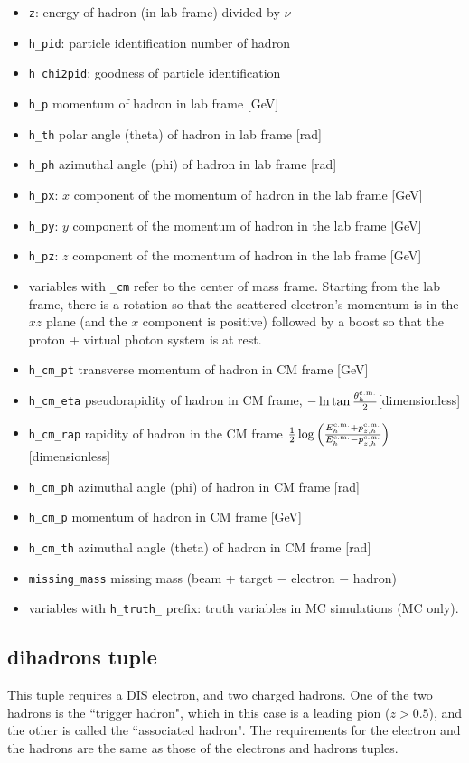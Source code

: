 \documentclass[english]{article}
\newcommand{\code}[1]{\texttt{#1}}
\begin{document}
\begin{itemize}
\item \code{z}:  energy of hadron (in lab frame) divided by $\nu$
\item \code{h\_pid}:  particle identification number of hadron \cite{pdgcodes}
\item \code{h\_chi2pid}:  goodness of particle identification
\item \code{h\_p} momentum of hadron in lab frame [GeV]
\item \code{h\_th} polar angle (theta) of hadron in lab frame [rad]
\item \code{h\_ph} azimuthal angle (phi) of hadron in lab frame [rad]
\item \code{h\_px}: $x$ component of the momentum of hadron in the lab frame [GeV]
\item \code{h\_py}: $y$ component of the momentum of hadron in the lab frame [GeV]
\item \code{h\_pz}: $z$ component of the momentum of hadron in the lab frame [GeV]
\item variables with \code{\_cm} refer to the center of mass frame.  Starting from the lab frame, there is a rotation so that the scattered electron's momentum is in the $xz$ plane (and the $x$ component is positive) followed by a boost so that the proton + virtual photon system is at rest.  
\item \code{h\_cm\_pt} transverse momentum of hadron in CM frame [GeV]
\item \code{h\_cm\_eta} pseudorapidity of hadron in CM frame, $-\ln\tan\frac{\theta^{\rm c.m.}_h}{2}$[dimensionless]
\item \code{h\_cm\_rap} rapidity of hadron in the CM frame $\frac {1}{2} \log\left(\frac{E^{\rm c.m.}_h+p^{\rm c.m.}_{z,h}}{E^{\rm c.m.}_h-p^{\rm c.m.}_{z,h}}\right)$ [dimensionless]
\item \code{h\_cm\_ph} azimuthal angle (phi) of hadron in CM frame [rad]
\item \code{h\_cm\_p}  momentum of hadron in CM frame [GeV]
\item \code{h\_cm\_th} azimuthal angle (theta) of hadron in CM frame [rad]
\item \code{missing\_mass} missing mass (beam + target $-$ electron $-$ hadron)
\item variables with \code{h\_truth\_} prefix: truth variables in MC simulations (MC only).  
\end{itemize}


\subsection{dihadrons tuple} 
This tuple requires a DIS electron, and two charged hadrons.  One of the two hadrons is the ``trigger hadron", which in this case is a leading pion ($z>0.5$), and the other is called the ``associated hadron".  The requirements for the electron and the hadrons are the same as those of the electrons and hadrons tuples.
\end{document}
